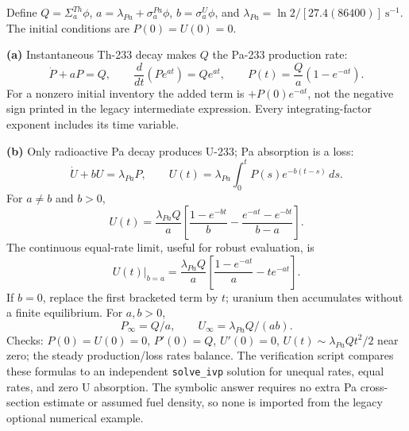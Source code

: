 \begin{adaptedsolution}

Define $Q=\Sigma_a^{Th}\phi$, $a=\lambda_{Pa}+\sigma_a^{Pa}\phi$,
$b=\sigma_a^U\phi$, and
$\lambda_{Pa}=\ln2/[27.4(86400)]~\mathrm{s^{-1}}$.
The initial conditions are $P(0)=U(0)=0$.

\textbf{(a)} Instantaneous Th-233 decay makes $Q$ the Pa-233 production rate:
\[
\dot P+aP=Q,\qquad
\frac{d}{dt}(Pe^{at})=Qe^{at},\qquad
\boxed{P(t)=\frac Qa(1-e^{-at})}.
\]
For a nonzero initial inventory the added term is $+P(0)e^{-at}$,
not the negative sign printed in the legacy intermediate expression.
Every integrating-factor exponent includes its time variable.

\textbf{(b)} Only radioactive Pa decay produces U-233; Pa absorption is a loss:
\[
\dot U+bU=\lambda_{Pa}P,\qquad
U(t)=\lambda_{Pa}\int_0^t P(s)e^{-b(t-s)}\,ds.
\]
For $a\ne b$ and $b>0$,
\[
\boxed{U(t)=\frac{\lambda_{Pa}Q}{a}
\left[\frac{1-e^{-bt}}b-
\frac{e^{-at}-e^{-bt}}{b-a}\right]}.
\]
The continuous equal-rate limit, useful for robust evaluation, is
\[
U(t)\big|_{b=a}=\frac{\lambda_{Pa}Q}{a}
\left[\frac{1-e^{-at}}a-te^{-at}\right].
\]
If $b=0$, replace the first bracketed term by $t$; uranium then accumulates
without a finite equilibrium. For $a,b>0$,
\[
P_\infty=Q/a,\qquad U_\infty=\lambda_{Pa}Q/(ab).
\]
Checks: $P(0)=U(0)=0$, $P'(0)=Q$, $U'(0)=0$,
$U(t)\sim\lambda_{Pa}Qt^2/2$ near zero; the steady production/loss rates balance.
The verification script compares these formulas to an independent
\texttt{solve\_ivp} solution for unequal rates, equal rates, and zero U absorption.
The symbolic answer requires no extra Pa cross-section estimate or assumed
fuel density, so none is imported from the legacy optional numerical example.

\end{adaptedsolution}
